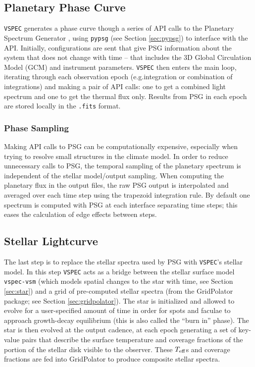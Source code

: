 \documentclass[twocolumn]{aastex631}
\newcommand{\teff}{$T_{\rm eff}$}
\newcommand{\vspec}[1]{\texttt{VSPEC}#1}
\begin{document}
\subsection{Planetary Phase Curve}
\label{subsec:phase-curve}
\vspec{} generates a phase curve though a series of API calls to the Planetary Spectrum Generator \citep[PSG][]{villanueva2018}, using
\texttt{pypsg} (see Section \ref{sec:pypsg}) to interface with the API. Initially, configurations are sent that give PSG information about
the system that does not change with time -- that includes the 3D Global Circulation Model (GCM) and instrument parameters. \vspec{} then enters
the main loop, iterating through each observation epoch (e.g.integration or combination of integrations) and making a pair of API calls: one to get a combined light spectrum and one to get the thermal flux only.
Results from PSG in each epoch are stored locally in the \texttt{.fits} format. 

\subsubsection{Phase Sampling}
Making API calls to PSG can be computationally expensive, especially when trying to resolve small structures in the climate model. In order to reduce unnecessary calls to PSG, the temporal sampling of the planetary spectrum is independent of the stellar model/output sampling. When computing the planetary flux in the output files, the raw PSG output is interpolated and averaged over each time step using the trapezoid integration rule. By default one spectrum is computed with PSG at each interface separating time steps; this eases the calculation of edge effects between steps.

\subsection{Stellar Lightcurve}

The last step is to replace the stellar spectra used by PSG with \vspec{}'s stellar model. In this step \vspec{} acts as a bridge between
the stellar surface model \texttt{vspec-vsm} (which models spatial changes to the star with time, see Section \ref{sec:star}) and a grid of
pre-computed stellar spectra (from the GridPolator package; see Section \ref{sec:gridpolator}). The star is initialized and allowed to evolve for a user-specified amount of time in order for spots and faculae to approach growth-decay equilibrium (this is also called the ``burn in'' phase). The star is then evolved at the output cadence, at each epoch generating a set of key-value pairs that describe the surface temperature and coverage fractions of the portion of the stellar disk visible to the observer. These \teff s and coverage fractions are fed into GridPolator to produce composite stellar spectra.
\end{document}
